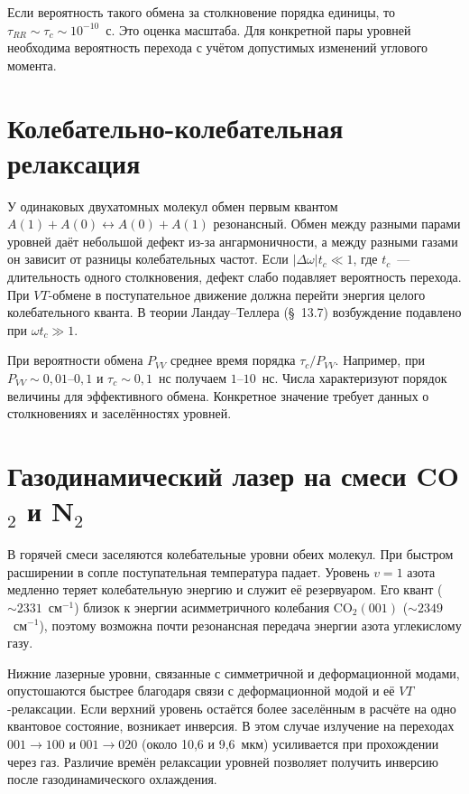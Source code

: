 \documentclass[12pt,a4paper]{article}
\newcommand{\COO}{\mathrm{CO_2}}
\begin{document}
Если вероятность такого обмена за столкновение порядка единицы, то
$\tau_{RR}\sim\tau_c\sim10^{-10}$~с. Это оценка масштаба. Для
конкретной пары уровней необходима вероятность перехода с учётом
допустимых изменений углового момента.

\section{Колебательно-колебательная релаксация}

У одинаковых двухатомных молекул обмен первым квантом
$A(1)+A(0)\leftrightarrow A(0)+A(1)$ резонансный. Обмен между
разными парами уровней даёт небольшой дефект из-за ангармоничности,
а между разными газами он зависит от разницы колебательных частот.
Если $|\Delta\omega|t_c\ll1$, где $t_c$~--- длительность одного
столкновения, дефект слабо подавляет вероятность перехода. При $VT$-обмене
в поступательное движение должна перейти энергия целого колебательного
кванта. В теории Ландау--Теллера (§~13.7) возбуждение подавлено при
$\omega t_c\gg1$.

При вероятности обмена $P_{VV}$ среднее время порядка
$\tau_c/P_{VV}$. Например, при $P_{VV}\sim0{,}01$--$0{,}1$ и
$\tau_c\sim0{,}1$~нс получаем $1$--$10$~нс. Числа характеризуют
порядок величины для эффективного обмена. Конкретное значение требует
данных о столкновениях и заселённостях уровней.

\section{Газодинамический лазер на смеси CO$_2$ и N$_2$}

В горячей смеси заселяются колебательные уровни обеих молекул. При быстром
расширении в сопле поступательная температура падает. Уровень $v=1$
азота медленно теряет колебательную энергию и служит её резервуаром.
Его квант ($\sim2331$~см$^{-1}$) близок к энергии асимметричного
колебания $\COO(001)$ ($\sim2349$~см$^{-1}$), поэтому возможна
почти резонансная передача энергии азота углекислому газу.

Нижние лазерные уровни, связанные с симметричной и деформационной модами,
опустошаются быстрее благодаря связи с деформационной модой и её
$VT$-релаксации. Если верхний уровень остаётся более заселённым в расчёте
на одно квантовое состояние, возникает инверсия. В этом случае
излучение на переходах $001\to100$ и $001\to020$
(около 10,6 и 9,6~мкм) усиливается при прохождении через газ.
Различие времён релаксации уровней позволяет получить инверсию после
газодинамического охлаждения.
\end{document}
